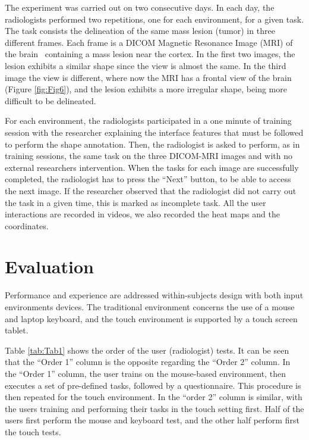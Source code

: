 \documentclass{sigchi}
\begin{document}
The experiment was carried out on two consecutive days. In each day, the  radiologists performed two repetitions, one for each environment, for a given task. The task consists the delineation of the same mass lesion (tumor) in three different frames. Each frame is a DICOM Magnetic Resonance Image (MRI) of the brain~\cite{mildenberger2002introduction} containing a mass lesion near the cortex. In the first two images, the lesion exhibits a similar shape since the view is almost the same. In the third image the view is different, where now the MRI has a frontal view of the brain (Figure \ref{fig:Fig6}), and the lesion exhibits a more irregular shape, being more difficult to be delineated.
 
For each environment, the radiologists participated in a one minute of training session with the researcher explaining the interface features that must be followed to perform the shape annotation. Then, the radiologist is asked to perform, as in training sessions, the same task on the three DICOM-MRI images and with no external researchers intervention. When the tasks for each image are successfully completed, the radiologist has to press the ``Next'' button, to be able to access the next image. If the researcher observed that the radiologist did not carry out the task in a given time, this is marked as incomplete task. All the user interactions are recorded in videos, we also recorded the heat maps 
and the coordinates. 

\section{Evaluation}

Performance and experience are addressed within-subjects design with both input environments devices. The traditional environment concerns the use of a mouse and laptop keyboard, and the touch environment is supported by a touch screen tablet.

Table \ref{tab:Tab1} shows the order of the user (radiologist) tests. It can be seen that the ``Order 1'' column is the opposite regarding the ``Order 2'' column. In the ``Order 1'' column, the user trains on the mouse-based environment, then executes a set of pre-defined tasks, followed by a questionnaire. This procedure is then repeated for the touch environment. In the ``order 2'' column is similar, with the users training and performing their tasks in the touch setting first. Half of the users first perform the mouse and keyboard test, and the other half perform first the touch tests.
\end{document}
